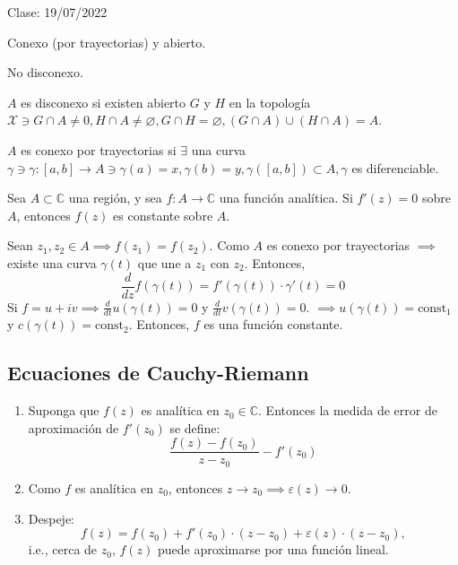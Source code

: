 Clase: 19/07/2022

\begin{cajita}
    \begin{definicion}[Región]
        Conexo (por trayectorias) y abierto. 
    \end{definicion}
    \begin{definicion}[Conexo]
        No disconexo. 
    \end{definicion}
    \begin{definicion}[Disconexo]
        $A$ es disconexo si existen abierto $G$ y $H$ en la topología $\mathcal{X}\ni G\cap A\neq0, H\cap A\neq\varnothing,G\cap H = \varnothing, (G\cap A)\cup (H\cap A)=A$. 
    \end{definicion}
    \begin{definicion}
        $A$ es conexo por trayectorias si $\exists$ una curva $\gamma\ni \gamma: [a,b]\to A\ni \gamma(a)=x,\gamma(b)=y,\gamma([a,b])\subset A, \gamma$ es diferenciable. 
    \end{definicion}
\end{cajita}

\begin{prop}
    Sea $A\subset \mathbb{C}$ una región, y sea $f:A\to\mathbb{C}$ una función analítica. Si $f'(z)=0$ sobre $A$, entonces $f(z)$ es constante sobre $A$. 
    \begin{dem}
        Sean $z_1,z_2\in A\implies f(z_1)=f(z_2)$. Como $A$ es conexo por trayectorias $\implies$ existe una curva $\gamma(t)$ que une a $z_1$ con $z_2$. Entonces, 
        $$\frac{d}{dz}f\left(\gamma(t)\right)= f'(\gamma(t))\cdot \gamma'(t)=0$$
        Si $f=u+iv\implies \frac{d}{dt}u(\gamma(t))=0$ y $\frac{d}{dt}v(\gamma(t))=0$. $\implies u(\gamma(t))=\text{const}_1$ y $c(\gamma(t))=\text{const}_2$. Entonces, $f$ es una función constante.
    \end{dem}
\end{prop}

\subsection{Ecuaciones de Cauchy-Riemann}

\begin{nota}
    \begin{enumerate}
        \item Suponga que $f(z)$ es analítica en $z_0\in \mathbb{C}$. Entonces la medida de error de aproximación de $f'(z_0)$ se define: 
        $$\frac{f(z)-f(z_0)}{z-z_0}-f'(z_0)$$
        \item Como $f$ es analítica en $z_0$, entonces $z\to z_0\implies \varepsilon(z)\to 0$.
        \item Despeje: 
            $$f(z)=f(z_0)+f'(z_0)\cdot (z-z_0)+\varepsilon(z)\cdot (z-z_0),$$
            i.e., cerca de $z_0$, $f(z)$ puede aproximarse por una función lineal.
    \end{enumerate}
    
\end{nota}

